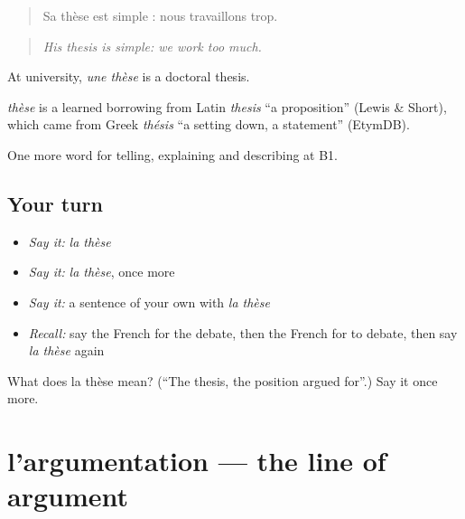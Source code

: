 \begin{quote}
Sa thèse est simple : nous travaillons trop.
\end{quote}

\begin{quote}
\emph{His thesis is simple: we work too much.}
\end{quote}

At university, \emph{une thèse} is a doctoral thesis.

\begin{cousinweb}
\emph{thèse} is a learned borrowing from Latin \emph{thesis} \textquotedblleft{}a proposition\textquotedblright{} (Lewis \& Short), which came from Greek \emph{thésis} \textquotedblleft{}a setting down, a statement\textquotedblright{} (EtymDB).
\end{cousinweb}

\begin{grammarlens}[title={What you've built}]
One more word for telling, explaining and describing at B1.
\end{grammarlens}

\subsection*{Your turn}
\begin{itemize}
\raggedright
  \item \emph{Say it:} \emph{la thèse}
  \item \emph{Say it:} \emph{la thèse}, once more
  \item \emph{Say it:} a sentence of your own with \emph{la thèse}
  \item \emph{Recall:} say the French for the debate, then the French for to debate, then say \emph{la thèse} again
\end{itemize}

\begin{tcolorbox}[breakable,colback=teal!4,colframe=teal!35!black,title={Before you move on}]
What does la thèse mean? (\textquotedblleft{}The thesis, the position argued for\textquotedblright{}.) Say it once more.
\end{tcolorbox}
\section[l'argumentation]{l'argumentation — the line of argument}

\label{lesson:FR-C335-argumentation}



